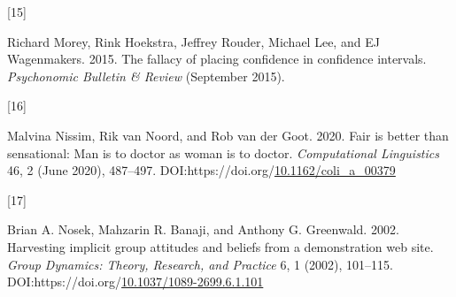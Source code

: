 \documentclass[
  12pt,
  dvipsnames,enabledeprecatedfontcommands]{scrartcl}
\newlength{\cslhangindent}
\newlength{\csllabelwidth}
\newlength{\cslentryspacingunit} %
\newenvironment{CSLReferences}[2] %
 {%
  \setlength{\parindent}{0pt}
  \ifodd #1
  \let\oldpar\par
  \def\par{\hangindent=\cslhangindent\oldpar}
  \fi
  \setlength{\parskip}{#2\cslentryspacingunit}
 }%
 {}
\newcommand{\CSLLeftMargin}[1]{\parbox[t]{\csllabelwidth}{#1}}
\newcommand{\CSLRightInline}[1]{\parbox[t]{\linewidth - \csllabelwidth}{#1}\break}
\begin{document}
\begin{CSLReferences}{0}{0}
\leavevmode{}%
\CSLLeftMargin{{[}15{]} }%
\CSLRightInline{Richard Morey, Rink Hoekstra, Jeffrey Rouder, Michael
Lee, and EJ Wagenmakers. 2015. The fallacy of placing confidence in
confidence intervals. \emph{Psychonomic Bulletin \& Review} (September
2015).}

\leavevmode{}%
\CSLLeftMargin{{[}16{]} }%
\CSLRightInline{Malvina Nissim, Rik van Noord, and Rob van der Goot.
2020. Fair is better than sensational: Man is to doctor as woman is to
doctor. \emph{Computational Linguistics} 46, 2 (June 2020), 487--497.
DOI:https://doi.org/\href{https://doi.org/10.1162/coli_a_00379}{10.1162/coli\_a\_00379}}

\leavevmode{}%
\CSLLeftMargin{{[}17{]} }%
\CSLRightInline{Brian A. Nosek, Mahzarin R. Banaji, and Anthony G.
Greenwald. 2002. Harvesting implicit group attitudes and beliefs from a
demonstration web site. \emph{Group Dynamics: Theory, Research, and
Practice} 6, 1 (2002), 101--115.
DOI:https://doi.org/\href{https://doi.org/10.1037/1089-2699.6.1.101}{10.1037/1089-2699.6.1.101}}

\end{CSLReferences}
\end{document}
